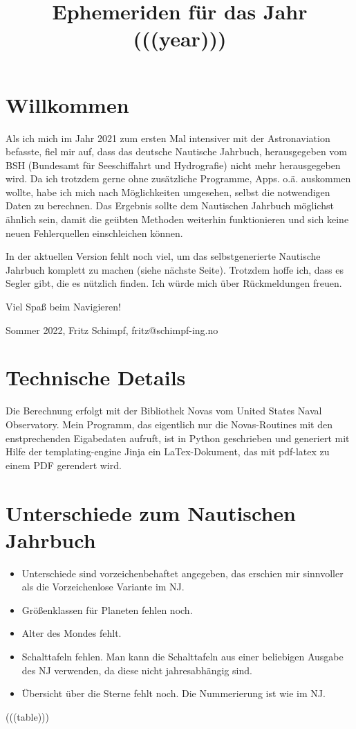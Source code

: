 \documentclass[a4paper, twoside]{book}
\title{Ephemeriden für das Jahr (((year)))}
\date{}
\begin{document}
\sffamily
\maketitle
\section{Willkommen}
Als ich mich im Jahr 2021 zum ersten Mal intensiver mit der Astronaviation befasste, fiel mir auf, dass das deutsche Nautische Jahrbuch, herausgegeben vom BSH (Bundesamt für Seeschiffahrt und Hydrografie) nicht mehr herausgegeben wird. Da ich trotzdem gerne ohne zusätzliche Programme, Apps. o.ä. auskommen wollte, habe ich mich nach Möglichkeiten umgesehen, selbst die notwendigen Daten zu berechnen. Das Ergebnis sollte dem Nautischen Jahrbuch möglichst ähnlich sein, damit die geübten Methoden weiterhin funktionieren und sich keine neuen Fehlerquellen einschleichen können.

\vspace{1cm}
In der aktuellen Version fehlt noch viel, um das selbstgenerierte Nautische Jahrbuch komplett zu machen (siehe nächste Seite). Trotzdem hoffe ich, dass es Segler gibt, die es nützlich finden. Ich würde mich über Rückmeldungen freuen.

\vspace{1cm}
\begin{center}
Viel Spaß beim Navigieren!

\vspace{1cm}
Sommer 2022, Fritz Schimpf, fritz@schimpf-ing.no
\end{center} 

\vspace{1cm}



\section{Technische Details}
Die Berechnung erfolgt mit der Bibliothek Novas vom United States Naval Observatory. Mein Programm, das eigentlich nur die Novas-Routines mit den enstprechenden Eigabedaten aufruft, ist in Python geschrieben und generiert mit Hilfe der templating-engine Jinja ein LaTex-Dokument, das mit pdf-latex zu einem PDF gerendert wird.

\newpage

\section{Unterschiede zum Nautischen Jahrbuch}
\begin{itemize}
\item Unterschiede sind vorzeichenbehaftet angegeben, das erschien mir sinnvoller als die Vorzeichenlose Variante im NJ.
\item Größenklassen für Planeten fehlen noch.
\item Alter des Mondes fehlt.
\item Schalttafeln fehlen. Man kann die Schalttafeln aus einer beliebigen Ausgabe des NJ verwenden, da diese nicht jahresabhängig sind.
\item Übersicht über die Sterne fehlt noch. Die Nummerierung ist wie im NJ.
\end{itemize}

\newpage

(((table)))
\end{document}
